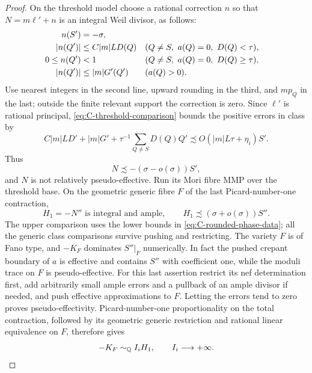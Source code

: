 \begin{proof}
On the threshold model choose a rational correction $n$ so that
$N=m\ell'+n$ is an integral Weil divisor, as follows:
\begin{align}
 n(S')&=-\sigma,\label{eq:C-rounded-phase-data}\\
 |n(Q')|&\leq C|m|LD(Q)
                 &&(Q\ne S,\ a(Q)=0,\ D(Q)<\tau),\notag\\
 0\leq n(Q')&<1
                 &&(Q\ne S,\ a(Q)=0,\ D(Q)\geq\tau),\notag\\
 |n(Q')|&\leq |m|G'(Q')
                 &&(a(Q)>0).\notag
\end{align}
Use nearest integers in the second line, upward rounding in the third,
and $mp_Q$ in the last; outside the finite relevant support the
correction is zero.  Since $\ell'$ is rational principal,
\eqref{eq:C-threshold-comparison} bounds the positive errors in class
by
\[
 C|m|LD'+|m|G'+\tau^{-1}\sum_{Q\ne S}D(Q)Q'
          \precsim O(|m|L\tau+\eta_i)S'.
\]
Thus
\[
                    N\precsim-(\sigma-o(\sigma))S',
\]
and $N$ is not relatively pseudo-effective.  Run its Mori fibre MMP
over the threshold base.  On the geometric generic fibre $F$ of the
last Picard-number-one contraction,
\begin{equation}\label{eq:C-large-index-threshold}
 H_1=-N''\text{ is integral and ample},\qquad
                   H_1\precsim(\sigma+o(\sigma))S''.
\end{equation}
The upper comparison uses the lower bounds in
\eqref{eq:C-rounded-phase-data}; all the generic class comparisons
survive pushing and restricting.  The variety $F$ is of Fano type,
and $-K_F$ dominates $S''|_F$ numerically.  In fact the pushed crepant
boundary of $a$ is effective and contains $S''$ with coefficient one,
while the moduli trace on $F$ is pseudo-effective.  For this last
assertion restrict its nef determination first, add arbitrarily small
ample errors and a pullback of an ample divisor if needed, and push
effective approximations to $F$.  Letting the errors tend to zero
proves pseudo-effectivity.  Picard-number-one proportionality on the
total contraction, followed by its geometric generic restriction and
rational linear equivalence on $F$, therefore gives
\begin{equation}\label{eq:C-unbounded-index}
                         -K_F\sim_\mathbb Q I_iH_1,
                               \qquad I_i\longrightarrow+\infty.
\end{equation}


\end{proof}
